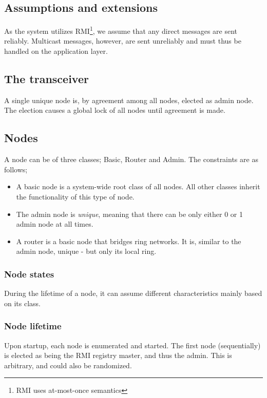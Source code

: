 \documentclass[10pt,a4paper]{article}
\begin{document}
\subsection{Assumptions and extensions}
As the system utilizes RMI\footnote{RMI uses at-most-once semantics}, we assume that any direct messages are sent reliably. Multicast messages, however, are sent unreliably and must thus be handled on the application layer.\\


\subsection{The transceiver}


A single unique node is, by agreement among all nodes, elected as admin node. The election causes a global lock of all nodes until agreement is made.
\subsection{Nodes}
A node can be of three classes; Basic, Router and Admin. The constraints are as follows;
\begin{itemize}
\item A basic node is a system-wide root class of all nodes. All other classes inherit the functionality of this type of node.
\item The admin node is \emph{unique}, meaning that there can be only either 0 or 1 admin node at all times.
\item A router is a basic node that bridges ring networks. It is, similar to the admin node, unique - but only its local ring.
\end{itemize}

\subsubsection{Node states}
During the lifetime of a node, it can assume different characteristics mainly based on its class.

\subsubsection{Node lifetime}
Upon startup, each node is enumerated and started. The first node (sequentially) is elected as being the RMI registry master, and thus the admin. This is arbitrary, and could also be randomized.
\end{document}
